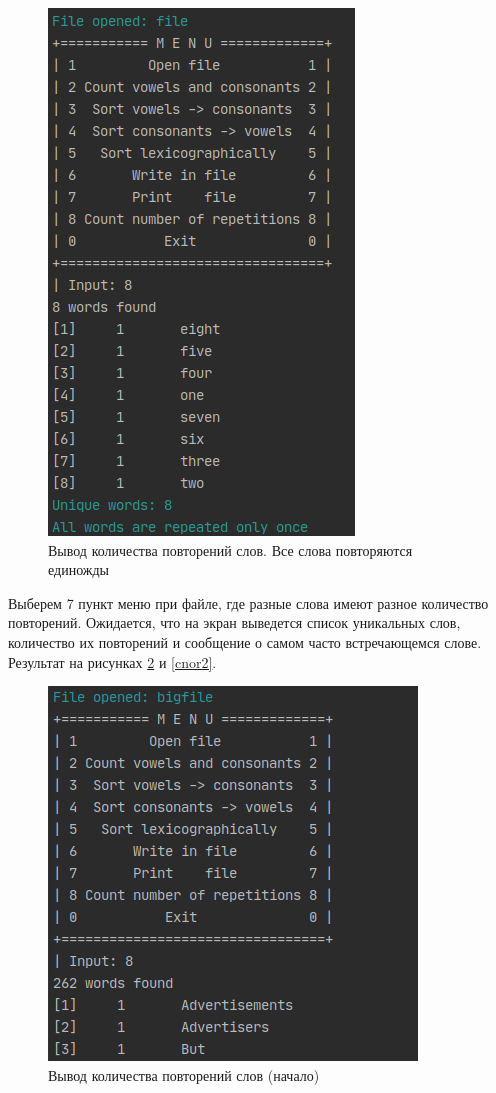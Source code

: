 \documentclass[12pt,a4paper]{article}  %
\begin{document}
\begin{figure}[htp!]
	\centering
	\includegraphics[width=0.5\linewidth]{photo/tests/count_num_of_reps}
	\caption{Вывод количества повторений слов. Все слова повторяются единожды}
	\label{count_num_of_reps}
\end{figure}

Выберем 7 пункт меню при файле, где разные слова имеют разное количество повторений. Ожидается, что на экран выведется список уникальных слов, количество их повторений и сообщение о самом часто встречающемся слове. Результат на рисунках \ref{cnor1} и \ref{cnor2}.

\begin{figure}[htp!]
	\centering
	\includegraphics[width=0.5\linewidth]{photo/tests/cnor1}
	\caption{Вывод количества повторений слов (начало)}
	\label{cnor1}
\end{figure}
\end{document}
